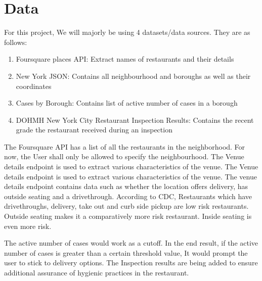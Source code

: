 \documentclass[11pt]{article}
\begin{document}
\section{Data}
\par For this project, We will majorly be using 4 datasets/data sources. They are as follows:
\begin{enumerate}
    \item Foursquare places API: Extract names of restaurants and their details
    \item New York JSON: Contains all neighbourhood and boroughs as well as their coordinates
    \item Cases by Borough: Contains list of active number of cases in a borough
    \item DOHMH New York City Restaurant Inspection Results: Contains the recent grade the restaurant received during an inspection
\end{enumerate}
\par The Foursquare API has a list of all the restaurants in the neighborhood. For now, the User shall only be allowed to specify the neighbourhood. The Venue details endpoint is used to extract various characteristics of the venue. The Venue details endpoint is used to extract various characteristics of the venue. The venue details endpoint contains data such as whether the location offers delivery, has outside seating and a drivethrough. According to CDC, Restaurants which have drivethroughs, delivery, take out and curb side pickup are low risk restaurants\cite{restaurantconsiderations:article}. Outside seating makes it a comparatively more risk restaurant. Inside seating is even more risk.
\par The active number of cases would work as a cutoff. In the end result, if the active number of cases is greater than a certain threshold value, It would prompt the user to stick to delivery options. The Inspection results are being added to ensure additional assurance of hygienic practices in the restaurant. 
\printbibliography
\end{document}
